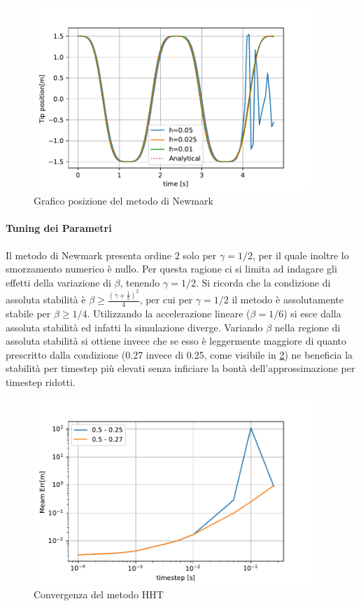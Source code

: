 \begin{figure}[h!]
\centering
\includegraphics[height=7cm]{Figure/Convergenza/Newm_pos.pdf}
\caption{Grafico posizione del metodo di Newmark}
 \label{fig:Newm_pos}
\end{figure}
\FloatBarrier
\paragraph{Tuning dei Parametri}
Il metodo di Newmark presenta ordine 2 solo per $\gamma = 1/2$, per il quale inoltre lo smorzamento numerico è nullo. Per questa ragione ci si limita ad indagare gli effetti della variazione di $\beta$, tenendo $\gamma = 1/2$. Si ricorda che la condizione di assoluta stabilità è $\beta \geq \frac{(\gamma + \frac{1}{2})^2}{4}$, per cui per $\gamma = 1/2$ il metodo è assolutamente stabile per $\beta \geq 1/4$. Utilizzando la accelerazione lineare ($\beta = 1/6$) si esce dalla assoluta stabilità ed infatti la simulazione diverge. Variando $\beta$ nella regione di assoluta stabilità si ottiene invece che se esso è leggermente maggiore di quanto prescritto dalla condizione (0.27 invece di 0.25, come visibile in \ref{fig:NewmComp}) ne beneficia la stabilità per timestep più elevati senza inficiare la bontà dell'approssimazione per timestep ridotti.

\begin{figure}[h!]
\centering
\includegraphics[height=7cm]{Figure/Convergenza/NewmComp.pdf}
\caption{Convergenza del metodo HHT}
 \label{fig:NewmComp}
\end{figure}

